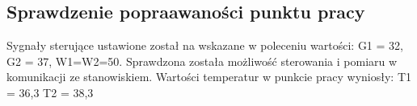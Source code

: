 \subsection{Sprawdzenie popraawaności punktu pracy}
\label{lab:zad1}

Sygnały sterujące ustawione został na wskazane w poleceniu wartości:
G1 = 32, G2 = 37, W1=W2=50. Sprawdzona została możliwość sterowania i pomiaru w
komunikacji ze stanowiskiem. Wartości temperatur w punkcie pracy wyniosły:
T1 = 36,3 T2 = 38,3

\newpage
